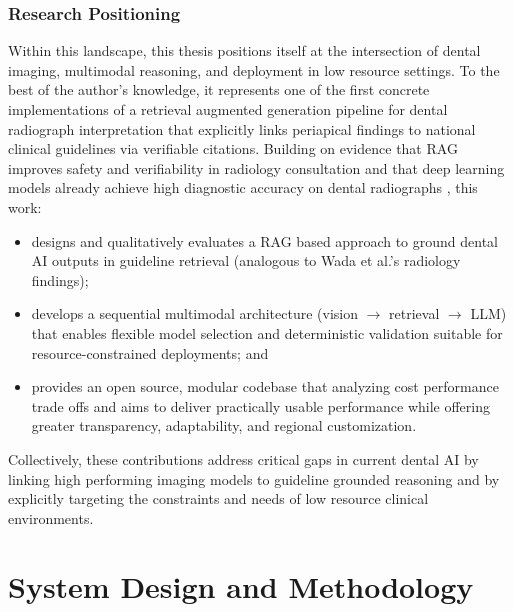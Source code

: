 \documentclass[12pt,a4paper]{report}
\begin{document}
	
	
	
	\subsection{Research Positioning}
	Within this landscape, this thesis positions itself at the intersection of
	dental imaging, multimodal reasoning, and deployment in low resource settings.
	To the best of the author's knowledge, it represents one of the first concrete
	implementations of a retrieval augmented generation pipeline for dental
	radiograph interpretation that explicitly links periapical findings to national
	clinical guidelines via verifiable citations. Building on evidence that RAG
	improves safety and verifiability in radiology consultation \cite{Wada2025RAGRadiology}
	and that deep learning models already achieve high diagnostic accuracy on dental
	radiographs \cite{Dashti2024DLCariesUmbrella,Arzani2025AICariesUmbrella}, this
	work:
	
	\begin{itemize}
		\item designs and qualitatively evaluates a RAG based approach to ground dental
		AI outputs in guideline retrieval (analogous to Wada et al.'s radiology
		findings);
		\item develops a sequential multimodal architecture (vision $\rightarrow$
		retrieval $\rightarrow$ LLM) that enables flexible model selection and
		deterministic validation suitable for resource-constrained deployments; and
		\item provides an open source, modular codebase that analyzing cost performance
		trade offs and aims to deliver practically usable performance while
		offering greater transparency, adaptability, and regional customization.
	\end{itemize}
	
	Collectively, these contributions address critical gaps in current dental AI by
	linking high performing imaging models to guideline grounded reasoning and by
	explicitly targeting the constraints and needs of low resource clinical
	environments.
	
	
		
	
	\chapter{System Design and Methodology}
	\label{chap:design}
	
\end{document}
